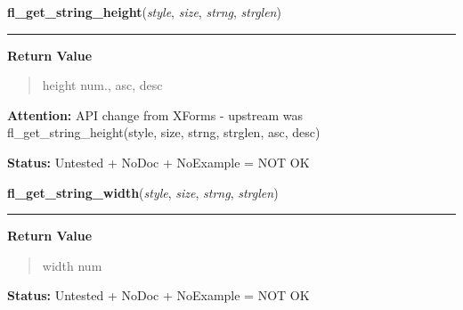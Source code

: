     \label{xformslib:library:fl_get_string_height}

    \vspace{0.5ex}

\hspace{.8\funcindent}\begin{boxedminipage}{\funcwidth}

    \raggedright \textbf{fl\_get\_string\_height}(\textit{style}, \textit{size}, \textit{strng}, \textit{strglen})

    \vspace{-1.5ex}

    \rule{\textwidth}{0.5\fboxrule}
\setlength{\parskip}{2ex}
\setlength{\parskip}{1ex}
      \textbf{Return Value}
    \vspace{-1ex}

      \begin{quote}
      height num., asc, desc

      \end{quote}

\textbf{Attention:} API change from XForms - upstream was fl\_get\_string\_height(style, size, 
strng, strglen, asc, desc)



\textbf{Status:} Untested + NoDoc + NoExample = NOT OK



    \end{boxedminipage}

    \label{xformslib:library:fl_get_string_width}

    \vspace{0.5ex}

\hspace{.8\funcindent}\begin{boxedminipage}{\funcwidth}

    \raggedright \textbf{fl\_get\_string\_width}(\textit{style}, \textit{size}, \textit{strng}, \textit{strglen})

    \vspace{-1.5ex}

    \rule{\textwidth}{0.5\fboxrule}
\setlength{\parskip}{2ex}
\setlength{\parskip}{1ex}
      \textbf{Return Value}
    \vspace{-1ex}

      \begin{quote}
      width num

      \end{quote}

\textbf{Status:} Untested + NoDoc + NoExample = NOT OK



    \end{boxedminipage}

